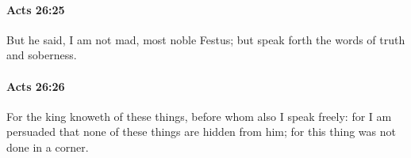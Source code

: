 		\paragraph{Acts 26:25} %
			\label{ACTS-26-25}

			But he said, I am not mad, most noble Festus; but speak forth the words of truth and soberness.

			\begin{framed}
			\scriptsize
				\begin{compactdesc}
					\item[SBLG] 
				\end{compactdesc}
			\end{framed}

		\paragraph{Acts 26:26} %
			\label{ACTS-26-26}

			For the king knoweth of these things, before whom also I speak freely: for I am persuaded that none of these things are hidden from him; for this thing was not done in a corner.

